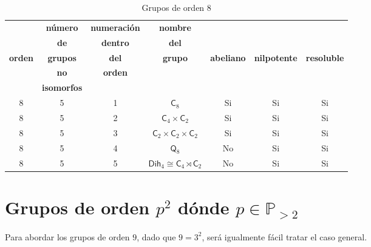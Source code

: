 \documentclass[12pt,a4paper,fleqn,spanish,final,openright]{extbook}
\theoremstyle{definition}
\theoremstyle{remark}
\begin{document}
    
    
    




\begin{table}[h!]
    \begin{center}
        \caption{Grupos de orden $8$}
        \label{tab:GruposOrden2p}
        \begin{tabular}{c|c|c|c|c|c|c} %
            \textbf{} & \tiny\textbf{número} &\tiny\textbf{numeración} & \tiny\textbf{nombre} & \textbf{} & {} & {} \\
            \textbf{} & \tiny\textbf{de} &\tiny\textbf{dentro} & \tiny\textbf{del} & \tiny\textbf{} & {} & {} \\
            \tiny\textbf{orden} & \tiny\textbf{grupos} & \tiny\textbf{del} & \tiny\textbf{grupo} & \tiny\textbf{abeliano}  & \tiny\textbf{nilpotente} & \tiny\textbf{resoluble} \\
            \textbf{} & \tiny\textbf{no} & \tiny\textbf{orden} & \textbf{} & \textbf{} & {} & {} \\
            \textbf{} & \tiny\textbf{isomorfos} &\textbf{} & \textbf{} & \textbf{} & {} & {} \\
            \hline
            8 & 5 & 1 & ${\textsf{C}}_{8}$ & Si & Si & Si \\
            \hline
            8 & 5 & 2  & ${{\textsf{C}}_{4}}\times{{\textsf{C}}_{2}}$ & Si & Si & Si \\
            \hline
            8 & 5 & 3 & ${{\textsf{C}}_{2}}\times{{\textsf{C}}_{2}}\times{{\textsf{C}}_{2}}$ & Si & Si & Si \\
            \hline
            8 & 5 & 4  & ${{\textsf{Q}}_{8}}$ & No & Si & Si \\
            \hline
            8 & 5 & 5 & ${{\textsf{Dih}}_{4}}  \cong  {{\textsf{C}}_{4}}\rtimes{{{\textsf{C}}_{2}}}$ & No & Si & Si \\
            \hline
        \end{tabular}
    \end{center}
\end{table}



\chapter{Grupos de orden $p^2$ dónde $p \in {\mathds{P}}_{>2}$}


Para abordar los grupos de orden $9$, dado que $9=3^2$, será igualmente fácil tratar el caso general.
\end{document}
